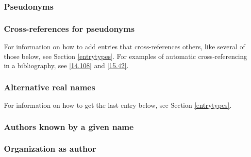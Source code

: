 \documentclass[11pt,letterpaper,oneside]{article}
\begin{document}
\subsubsection{Pseudonyms}

\begin{citebib}
\item \cite{akmuckraker2008}
\item \cite{carre1982}
\item \cite{stendhal1925}
\end{citebib}

\subsubsection{Cross-references for pseudonyms}
\label{14.81}

For information on how to add entries that cross-references others,
like several of those below, see Section \ref{entrytypes}. For
examples of automatic cross-referencing in a bibliography, see
\ref{14.108} and \ref{15.42}.

\begin{bibonly}
\nocite{ashe,creasey1976,creasey1978,creasey1966,morton,york}
\end{bibonly}

\subsubsection{Alternative real names}
\label{14.82}

For information on how to get the last entry below, see Section
\ref{entrytypes}.

\begin{bibonly}
\nocite{doniger2000,oflaherty}
\end{bibonly}

\subsubsection{Authors known by a given name}

\begin{citebib}
\item \cite{elizabeth2000}
\end{citebib}

\subsubsection{Organization as author}
\label{14.84}
\end{document}
